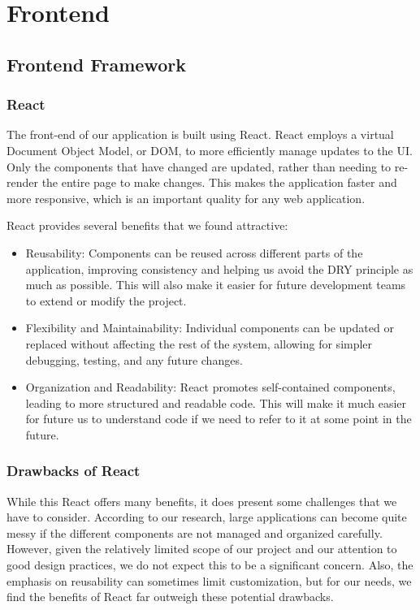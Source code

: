 \documentclass[12pt]{article}
\begin{document}
\section{Frontend}
\subsection{Frontend Framework}
\subsubsection{React}
The front-end of our application is built using React. React employs a virtual Document Object Model, or DOM, to more efficiently manage updates to the UI. Only the components that have changed are updated, rather than needing to re-render the entire page to make changes. This makes the application faster and more responsive, which is an important quality for any web application.

React provides several benefits that we found attractive:
\begin{itemize}
	\item Reusability: Components can be reused across different parts of the application, improving consistency and helping us avoid the DRY principle as much as possible. This will also make it easier for future development teams to extend or modify the project.
	\item Flexibility and Maintainability: Individual components can be updated or replaced without affecting the rest of the system, allowing for simpler debugging, testing, and any future changes. 
	\item Organization and Readability: React promotes self-contained components, leading to more structured and readable code. This will make it much easier for future us to understand code if we need to refer to it at some point in the future.
\end{itemize}

\subsubsection{Drawbacks of React}
While this React offers many benefits, it does present some challenges that we have to consider. According to our research, large applications can become quite messy if the different components are not managed and organized carefully. However, given the relatively limited scope of our project and our attention to good design practices, we do not expect this to be a significant concern. Also, the emphasis on reusability can sometimes limit customization, but for our needs, we find the benefits of React far outweigh these potential drawbacks.
\end{document}
